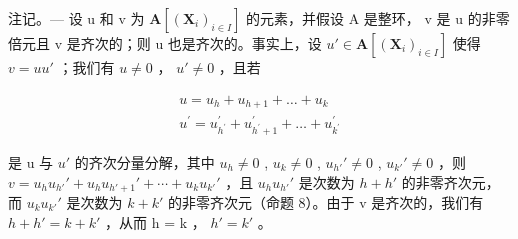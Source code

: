 注记。--- 设 u 和 v 为 \(\mathbf{A}[(\mathbf{X}_{i})_{i\in I}]\) 的元素，并假设 A 是整环， v 是 u 的非零倍元且 v 是齐次的；则 u 也是齐次的。事实上，设 \(u'\in\mathbf{A}[(\mathbf{X}_{i})_{i\in I}]\) 使得 \(v=uu'\) ；我们有 \(u\neq0\) ， \(u'\neq0\) ，且若

\[
\begin{array}{c} u = u _ {h} + u _ {h + 1} + \dots + u _ {k} \\ u ^ {\prime} = u _ {h ^ {\prime}} ^ {\prime} + u _ {h ^ {\prime} + 1} ^ {\prime} + \dots + u _ {k ^ {\prime}} ^ {\prime} \end{array}
\]

是 u 与 \(u'\) 的齐次分量分解，其中 \(u_{h} \neq 0\) , \(u_{k} \neq 0\) , \(u_{h'}' \neq 0\) , \(u_{k'}' \neq 0\) ，则 \(v = u_{h} u_{h'}' + u_{h} u_{h'+1}' + \cdots + u_{k} u_{k'}'\) ，且 \(u_{h} u_{h'}'\) 是次数为 \(h + h'\) 的非零齐次元，而 \(u_{k} u_{k'}'\) 是次数为 \(k + k'\) 的非零齐次元（命题 8）。由于 v 是齐次的，我们有 \(h + h' = k + k'\) ，从而 h = k ， \(h' = k'\) 。

